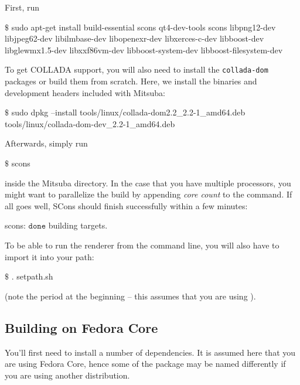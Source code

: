 First, run
\begin{shell}
$\text{\$}$ sudo apt-get install build-essential scons qt4-dev-tools scons libpng12-dev libjpeg62-dev libilmbase-dev libopenexr-dev libxerces-c-dev libboost-dev libglewmx1.5-dev libxxf86vm-dev libboost-system-dev libboost-filesystem-dev
\end{shell}
To get COLLADA support, you will also need to install the \texttt{collada-dom} packages or build them from scratch. Here, we install the  binaries and development headers included with Mitsuba:
\begin{shell}
$\text{\$}$ sudo dpkg --install tools/linux/collada-dom2.2_2.2-1_amd64.deb tools/linux/collada-dom-dev_2.2-1_amd64.deb
\end{shell}
Afterwards, simply run
\begin{shell}
$\text{\$}$ scons
\end{shell}
inside the Mitsuba directory. In the case that you have multiple processors, you might want to parallelize the build by appending \emph{core count} to the command.
If all goes well, SCons should finish successfully within a few minutes:
\begin{shell}
scons: $\texttt{done}$ building targets.
\end{shell}
To be able to run the renderer from the command line, you will also have to import it into your path:
\begin{shell}
$\text{\$}$ . setpath.sh
\end{shell}
(note the period at the beginning -- this assumes that you are using ).

\subsection{Building on Fedora Core}
You'll first need to install a number of dependencies. It is assumed here
that you are using Fedora Core, hence some of the package may be named differently if you are 
using another distribution.

